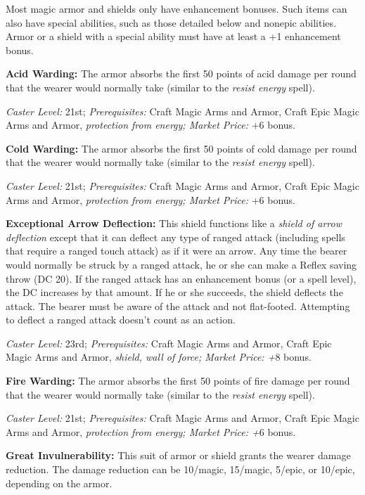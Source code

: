 \documentclass{article}
\begin{document}
Most magic armor and shields only have enhancement bonuses. Such items can also 
have special abilities, such as those detailed below and nonepic abilities\textit{. 
}Armor or a shield with a special ability must have at least a +1 enhancement bonus. 

\vspace{12pt}
\textbf{Acid Warding: }The armor absorbs the first 50 points of acid damage per 
round that the wearer would normally take (similar to the \textit{resist energy 
}spell). 

\textit{Caster Level: }21st; \textit{Prerequisites: }Craft Magic Arms and Armor, 
Craft Epic Magic Arms and Armor, \textit{protection from energy; Market Price: 
}+6 bonus. 

\textbf{Cold Warding: }The armor absorbs the first 50 points of cold damage per 
round that the wearer would normally take (similar to the \textit{resist energy 
}spell). 

\textit{Caster Level: }21st; \textit{Prerequisites: }Craft Magic Arms and Armor, 
Craft Epic Magic Arms and Armor, \textit{protection from energy; Market Price: 
}+6 bonus. 

\textbf{Exceptional Arrow Deflection: }This shield functions like a \textit{shield 
of arrow deflection }except that it can deflect any type of ranged attack (including 
spells that require a ranged touch attack) as if it were an arrow. Any time the 
bearer would normally be struck by a ranged attack, he or she can make a Reflex 
saving throw (DC 20). If the ranged attack has an enhancement bonus (or a spell 
level), the DC increases by that amount. If he or she succeeds, the shield deflects 
the attack. The bearer must be aware of the attack and not flat-footed. Attempting 
to deflect a ranged attack doesn't count as an action. 

\textit{Caster Level: }23rd; \textit{Prerequisites: }Craft Magic Arms and Armor, 
Craft Epic Magic Arms and Armor, \textit{shield, wall of force; Market Price: +}8 
bonus. 

\textbf{Fire Warding: }The armor absorbs the first 50 points of fire damage per 
round that the wearer would normally take (similar to the \textit{resist energy 
}spell). 

\textit{Caster Level: }21st; \textit{Prerequisites: }Craft Magic Arms and Armor, 
Craft Epic Magic Arms and Armor, \textit{protection from energy; Market Price: 
+}6 bonus. 

\textbf{Great Invulnerability: }This suit of armor or shield grants the wearer 
damage reduction. The damage reduction can be 10/magic, 15/magic, 5/epic, or 10/epic, 
depending on the armor. 
\end{document}
